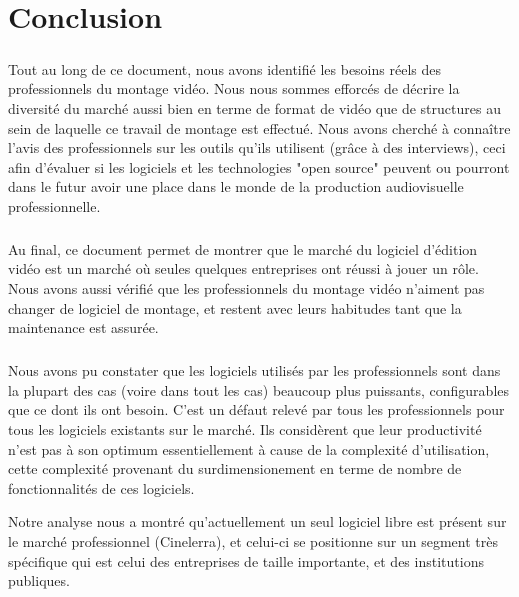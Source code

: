 \newpage \chapter*{Conclusion}

\paragraph{}

Tout au long de ce document, nous avons identifié les besoins réels
des professionnels du montage vidéo. Nous nous sommes efforcés de
décrire la diversité du marché aussi bien en terme de format
de vidéo que de structures au sein de laquelle ce travail de montage
est effectué. Nous avons  cherché à connaître l'avis des
professionnels sur les outils qu'ils utilisent (grâce à des interviews),
ceci afin d'évaluer si les logiciels et les technologies "open source"
peuvent ou pourront dans le futur avoir une place dans le monde de la
production audiovisuelle professionnelle.

\paragraph{}

Au final, ce document permet de montrer que le marché du logiciel
d'édition vidéo est un marché où seules quelques entreprises
ont réussi à jouer un rôle. Nous avons aussi vérifié que les
professionnels du montage vidéo n'aiment pas changer de logiciel de
montage, et restent avec leurs habitudes tant que la maintenance est
assurée.

\paragraph{}

Nous avons pu constater que les logiciels utilisés par les professionnels
sont dans la plupart des cas (voire dans tout les cas) beaucoup plus
puissants, configurables que ce dont ils ont besoin. C'est un défaut
relevé par tous les professionnels pour tous les logiciels existants
sur le marché. Ils considèrent que leur productivité n'est pas à
son optimum essentiellement à cause de la complexité d'utilisation,
cette complexité provenant du surdimensionement en terme de nombre de
fonctionnalités de ces logiciels.

Notre analyse nous a montré qu'actuellement un seul
logiciel libre est présent sur le marché professionnel (Cinelerra),
et celui-ci se positionne sur un segment très spécifique qui est celui
des entreprises de taille importante, et des institutions publiques.

